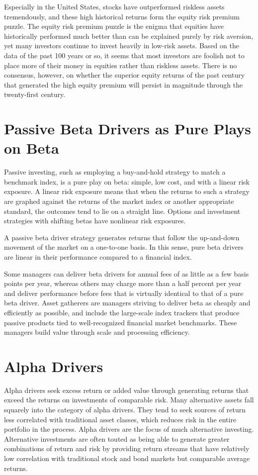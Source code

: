 \documentclass[11pt]{article}
\begin{document}
Especially in the United States, stocks have outperformed riskless assets tremendously, and these high historical returns form the equity risk premium puzzle. The equity risk premium puzzle is the enigma that equities have historically performed much better than can be explained purely by risk aversion, yet many investors continue to invest heavily in low-risk assets. Based on the data of the past 100 years or so, it seems that most investors are foolish not to place more of their money in equities rather than riskless assets. There is no consensus, however, on whether the superior equity returns of the past century that generated the high equity premium will persist in magnitude through the twenty-first century.

\section*{Passive Beta Drivers as Pure Plays on Beta}
Passive investing, such as employing a buy-and-hold strategy to match a benchmark index, is a pure play on beta: simple, low cost, and with a linear risk exposure. A linear risk exposure means that when the returns to such a strategy are graphed against the returns of the market index or another appropriate standard, the outcomes tend to lie on a straight line. Options and investment strategies with shifting betas have nonlinear risk exposures.

A passive beta driver strategy generates returns that follow the up-and-down movement of the market on a one-to-one basis. In this sense, pure beta drivers are linear in their performance compared to a financial index.

Some managers can deliver beta drivers for annual fees of as little as a few basis points per year, whereas others may charge more than a half percent per year and deliver performance before fees that is virtually identical to that of a pure beta driver. Asset gatherers are managers striving to deliver beta as cheaply and efficiently as possible, and include the large-scale index trackers that produce passive products tied to well-recognized financial market benchmarks. These managers build value through scale and processing efficiency.

\section*{Alpha Drivers}
Alpha drivers seek excess return or added value through generating returns that exceed the returns on investments of comparable risk. Many alternative assets fall squarely into the category of alpha drivers. They tend to seek sources of return less correlated with traditional asset classes, which reduces risk in the entire portfolio in the process. Alpha drivers are the focus of much alternative investing. Alternative investments are often touted as being able to generate greater combinations of return and risk by providing return streams that have relatively low correlation with traditional stock and bond markets but comparable average returns.
\end{document}
